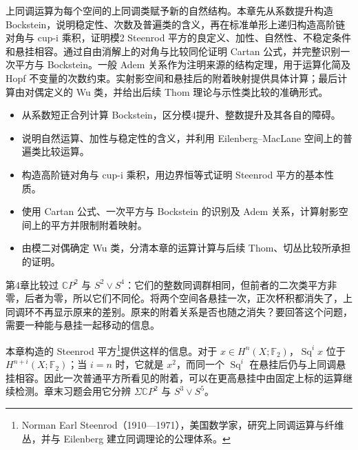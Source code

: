 
% 
% 


\begin{chapterabstract}
	上同调运算为每个空间的上同调类赋予新的自然结构。本章先从系数提升构造 Bockstein，说明稳定性、次数及普遍类的含义，再在标准单形上递归构造高阶链对角与 cup-i 乘积，证明模2 Steenrod 平方的良定义、加性、自然性、不稳定条件和悬挂相容。通过自由消解上的对角与比较同伦证明 Cartan 公式，并完整识别一次平方与 Bockstein。一般 Adem 关系作为注明来源的结构定理，用于运算化简及 Hopf 不变量的次数约束。实射影空间和悬挂后的附着映射提供具体计算；最后计算由对偶定义的 Wu 类，并给出后续 Thom 理论与示性类比较的准确形式。
\end{chapterabstract}

\begin{learninggoals}
	\begin{itemize}
		\item 从系数短正合列计算 Bockstein，区分模4提升、整数提升及其各自的障碍。
		\item 说明自然运算、加性与稳定性的含义，并利用 Eilenberg--MacLane 空间上的普遍类比较运算。
		\item 构造高阶链对角与 cup-i 乘积，用边界恒等式证明 Steenrod 平方的基本性质。
		\item 使用 Cartan 公式、一次平方与 Bockstein 的识别及 Adem 关系，计算射影空间上的平方并限制附着映射。
		\item 由模二对偶确定 Wu 类，分清本章的运算计算与后续 Thom、切丛比较所承担的证明。
	\end{itemize}
\end{learninggoals}

第4章比较过 \(\mathbb CP^2\) 与 \(S^2\vee S^4\)：它们的整数同调群相同，但前者的二次类平方非零，后者为零，所以它们不同伦。将两个空间各悬挂一次，正次杯积都消失了，上同调环不再显示原来的差别。原来的附着关系是否也随之消失？要回答这个问题，需要一种能与悬挂一起移动的信息。

\ProseParagraphBreak

本章构造的 Steenrod 平方\footnote{Norman Earl Steenrod（1910—1971），美国数学家，研究上同调运算与纤维丛，并与 Eilenberg 建立同调理论的公理体系。}提供这样的信息。对于 \(x\in H^n(X;\mathbb F_2)\)，\(\operatorname{Sq}^i x\) 位于 \(H^{n+i}(X;\mathbb F_2)\)；当 \(i=n\) 时，它就是 \(x^2\)，而同一个 \(\operatorname{Sq}^i\) 在悬挂后仍与上同调悬挂相容。因此一次普通平方所看见的附着，可以在更高悬挂中由固定上标的运算继续检测。章末习题会用它分辨 \(\Sigma\mathbb CP^2\) 与 \(S^3\vee S^5\)。


